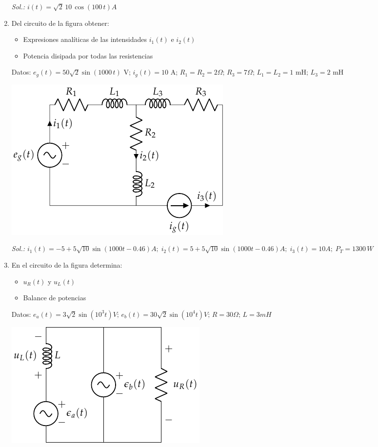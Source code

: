 \begin{enumerate}
  \emph{Sol.: $i(t)=\sqrt{2}\,10\,\cos(100\,t) A$}

\item Del circuito de la figura obtener:
  \begin{itemize}
  \item Expresiones analíticas de las intensidades $i_1(t)$ e $i_2(t)$
  \item Potencia disipada por todas las resistencias
  \end{itemize}

  Datos: $e_g(t)=50\sqrt{2}\sin(1000\,t)$ V; $i_g(t)=10$ A;
  $R_1=R_2=2\Omega$; $R_3=7\Omega$; $L_1=L_2=1$ mH; $L_3=2$ mH
  \begin{center}
    \includegraphics{../figs/ej18_BT2.pdf}
  \end{center}
  \emph{Sol.:
    $i_1(t)= -5+5\sqrt{10}\sin(1000t-0.46) A;\; i_2(t)=
    5+5\sqrt{10}\sin(1000t-0.46) A;\; i_3(t)= 10 A;\; P_T=1300\,W$}

\item En el circuito de la figura determina:
  \begin{itemize}
  \item $u_R(t)$ y $u_L(t)$
  \item Balance de potencias
  \end{itemize}
  Datos:
  $e_a(t) = {3\sqrt{2} \sin(10^3 t)} V;\,e_b(t) = {30\sqrt{2}
    \sin(10^4 t)} V;\,R = {30}{\Omega};\,L = {3}{mH}$
  \begin{center}
    \includegraphics{../figs/superposicion2_ej.pdf}
  \end{center}


\end{enumerate}
